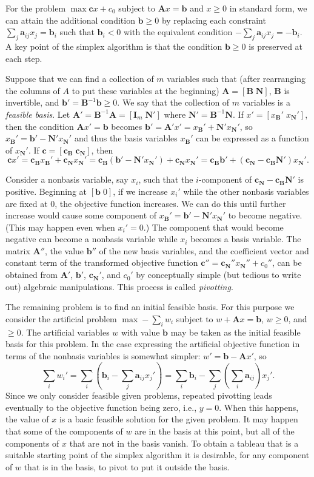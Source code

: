 \documentclass[12pt]{article}
\theoremstyle{definition}
\newcommand{\ba}{\mathbf{a}}
\newcommand{\bb}{\mathbf{b}}
\newcommand{\bc}{\mathbf{c}}
\newcommand{\bA}{\mathbf{A}}
\newcommand{\bB}{\mathbf{B}}
\newcommand{\bI}{\mathbf{I}}
\newcommand{\bN}{\mathbf{N}}
\begin{document}
\begin{appendix}
For the problem $\max \bc x + c_0$ subject to $\bA x = \bb$ and $x \ge
0$ in standard form, we can attain the additional condition $\bb \ge
0$ by replacing each constraint $\sum_j \ba_{ij} x_j = \bb_i$ such
that $\bb_i < 0$ with the equivalent condition $-\sum_j \ba_{ij} x_j =
-\bb_i$.  A key point of the simplex algorithm is that the condition
$\bb \ge 0$ is preserved at each step.

Suppose that we can find a collection of $m$ variables such that
(after rearranging the columns of $A$ to put these variables at the
beginning) $\bA = [\bB \; \bN]$, $\bB$ is invertible, and $\bb' =
\bB^{-1} \bb \ge 0$.  We say that the collection of $m$ variables is a
\emph{feasible basis}.  Let $\bA' = \bB^{-1}\bA = [\bI_m \; \bN']$ where
$\bN' = \bB^{-1}\bN$.  If $x' = [x_\bB' \; x_\bN']$, then the
condition $\bA x' = \bb$ becomes $\bb' = \bA' x' = x_\bB' + \bN'
x_\bN'$, so $x_\bB' = \bb' - \bN' x_\bN'$ and thus the basis variables
$x_\bB'$ can be expressed as a function of $x_\bN'$.  If $\bc =
[\bc_\bB \; \bc_\bN]$, then $$\bc x' = \bc_\bB x_\bB' + \bc_\bN x_\bN'
= \bc_\bB (\bb' - \bN' x_\bN') + \bc_\bN x_\bN' = \bc_\bB \bb' +
(\bc_\bN - \bc_\bB \bN')x_\bN'.$$

Consider a nonbasis variable, say $x_i$, such that the $i$-component
of $\bc_\bN - \bc_\bB \bN'$ is positive.  Beginning at $[\bb \; 0]$,
if we increase $x_i'$ while the other nonbasis variables are fixed at
$0$, the objective function increases.  We can do this until further
increase would cause some component of $x_\bB' = \bb' - \bN' x_\bN'$
to become negative.  (This may happen even when $x_i' = 0$.)  The
component that would become negative can become a nonbasis variable
while $x_i$ becomes a basis variable.  The matrix $\bA''$, the value
$\bb''$ of the new basis variables, and the coefficient vector and
constant term of the transformed objective function $\bc'' = \bc_\bN''
x_\bN'' + c_0''$, can be obtained from $\bA'$, $\bb'$, $\bc_\bN'$, and
$c_0'$ by conceptually simple (but tedious to write out) algebraic
manipulations.  This process is called \emph{pivotting}.

The remaining problem is to find an initial feasible basis.  For this
purpose we consider the artificial problem $\max - \sum_i w_i$ subject
to $w + \bA x = \bb$, $w \ge 0$, and $ \ge 0$.  The artificial
variables $w$ with value $\bb$ may be taken as the initial feasible
basis for this problem.  In the case expressing the artificial
objective function in terms of the nonbasis variables is somewhat
simpler: $w' = \bb - \bA x'$, so $$\sum_i w_i' = \sum_i (\bb_i -
\sum_j \ba_{ij} x_j') = \sum_i \bb_i - \sum_j (\sum_i \ba_{ij})x_j'.$$
Since we only consider feasible given problems, repeated pivotting
leads eventually to the objective function being zero, i.e., $y = 0$.
When this happens, the value of $x$ is a basic feasible solution for
the given problem.  It may happen that some of the components of $w$
are in the basis at this point, but all of the components of $x$ that
are not in the basis vanish.  To obtain a tableau that is a suitable
starting point of the simplex algorithm it is desirable, for any
component of $w$ that is in the basis, to pivot to put it outside the
basis.


\end{appendix}
\end{document}
